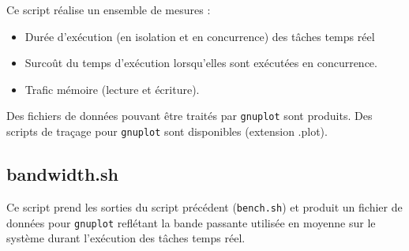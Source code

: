 \begin{appendices}
  Ce script réalise un ensemble de mesures : 
  \begin{itemize}
    \renewcommand{\labelitemi}{$\bullet$}
  \item Durée d'exécution (en isolation et en concurrence) des tâches temps réel
  \item Surcoût du temps d'exécution lorsqu'elles sont exécutées en concurrence.
  \item Trafic mémoire (lecture et écriture).
  \end{itemize}

  Des fichiers de données pouvant être traités par \texttt{gnuplot} sont produits. Des
  scripts de traçage pour \texttt{gnuplot} sont disponibles (extension .plot). 

  \subsection{bandwidth.sh}

  Ce script prend les sorties du script précédent (\texttt{bench.sh}) et produit un 
  fichier de données pour \texttt{gnuplot} reflétant la bande passante utilisée en 
  moyenne sur le système durant l'exécution des tâches temps réel. 

\end{appendices}
